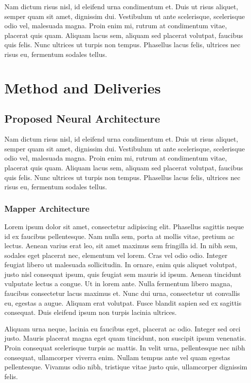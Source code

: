 \documentclass{cta-author}
\begin{document}
Nam dictum risus nisl, id eleifend urna condimentum et. Duis ut risus aliquet, semper quam sit amet, dignissim dui. Vestibulum ut ante scelerisque, scelerisque odio vel, malesuada magna. Proin enim mi, rutrum at condimentum vitae, placerat quis quam. Aliquam lacus sem, aliquam sed placerat volutpat, faucibus quis felis. Nunc ultrices ut turpis non tempus. Phasellus lacus felis, ultrices nec risus eu, fermentum sodales tellus.

\section{Method and Deliveries}

\subsection{Proposed Neural Architecture}

Nam dictum risus nisl, id eleifend urna condimentum et. Duis ut risus aliquet, semper quam sit amet, dignissim dui. Vestibulum ut ante scelerisque, scelerisque odio vel, malesuada magna. Proin enim mi, rutrum at condimentum vitae, placerat quis quam. Aliquam lacus sem, aliquam sed placerat volutpat, faucibus quis felis. Nunc ultrices ut turpis non tempus. Phasellus lacus felis, ultrices nec risus eu, fermentum sodales tellus.

\subsubsection{Mapper Architecture}


Lorem ipsum dolor sit amet, consectetur adipiscing elit. Phasellus sagittis neque id ex faucibus pellentesque. Nam nulla sem, porta at mollis vitae, pretium ac lectus. Aenean varius erat leo, sit amet maximus sem fringilla id. In nibh sem, sodales eget placerat nec, elementum vel lorem. Cras vel odio odio. Integer feugiat libero ut malesuada sollicitudin. In ornare, enim quis aliquet volutpat, justo nisl consequat ipsum, quis feugiat sem mauris id ipsum. Aenean tincidunt vulputate lectus a congue. Ut in lorem ante. Nulla fermentum libero magna, faucibus consectetur lacus maximus et. Nunc dui urna, consectetur ut convallis eu, egestas a augue. Aliquam erat volutpat. Fusce blandit sapien sed ex sagittis consequat. Duis eleifend ipsum non turpis lacinia ultrices.

Aliquam urna neque, lacinia eu faucibus eget, placerat ac odio. Integer sed orci justo. Mauris placerat magna eget quam tincidunt, non suscipit ipsum venenatis. Proin consequat scelerisque turpis ac mattis. In velit urna, pellentesque nec nibh consequat, ullamcorper viverra enim. Nullam tempus ante vel quam egestas pellentesque. Vivamus odio nibh, tristique vitae justo quis, ullamcorper dignissim felis.
\end{document}
